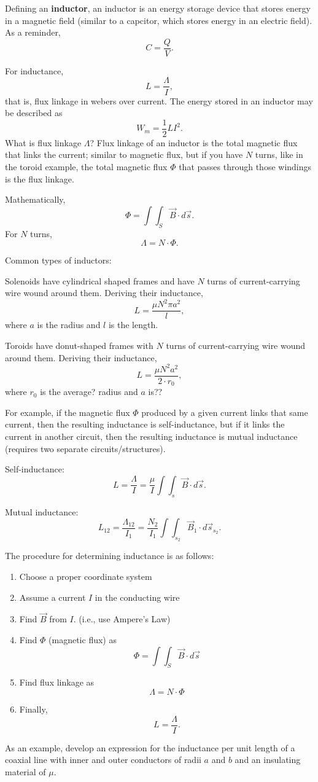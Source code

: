 \documentclass{article}
\begin{document}
Defining an \textbf{inductor}, an inductor is an energy storage device that stores energy in a magnetic field (similar to a capcitor, which stores energy in an electric field). As a reminder, \[C = \frac{Q}{V}.\]

For inductance, 
\[
  L = \frac{\Lambda}{I},
\]
that is, flux linkage in webers over current. The energy stored in an inductor may be described as 
\[
  W_m = \frac{1}{2}LI^2.
\]
What is flux linkage \(\Lambda\)? Flux linkage of an inductor is the total magnetic flux that links the current; similar to magnetic flux, but if you have \(N\) turns, like in the toroid example, the total magnetic flux \(\Phi\) that passes through those windings is the flux linkage.

Mathematically, 
\[
  \Phi = \int\int_S \vec{B} \cdot d \vec{s}.
\]
For \(N\) turns, 
\[
  \Lambda = N \cdot \Phi.
\]

Common types of inductors:

Solenoids have cylindrical shaped frames and have \(N\) turns of current-carrying wire wound around them. Deriving their inductance, 
\[
  L = \frac{\mu N^2 \pi a^2}{l},
\]
where \(a\) is the radius and \(l\) is the length. 

Toroids have donut-shaped frames with \(N\) turns of current-carrying wire wound around them. Deriving their inductance, 
\[
  L = \frac{\mu N^2 a^2}{2 \cdot r_0},
\]
where \(r_0\) is the average? radius and \(a\) is??

For example, if the magnetic flux \(\Phi\) produced by a given current links that same current, then the resulting inductance is self-inductance, but if it links the current in another circuit, then the resulting inductance is mutual inductance (requires two separate circuits/structures).

Self-inductance:
\[
	L = \frac{\Lambda}{I} = \frac{\mu}{I} \int \int_s \vec{B} \cdot d \vec{s}.
\]

Mutual inductance: 
\[
	L_{12} = \frac{\Lambda_{12}}{I_{1}} = \frac{N_2}{I_1} \int \int_{s_2} \vec{B}_1 \cdot d \vec{s}_{s_2}.
\]

The procedure for determining inductance is as follows:
\begin{enumerate}
	\item Choose a proper coordinate system
	\item Assume a current \(I\) in the conducting wire
	\item Find \(\vec{B}\) from \(I\). (i.e., use Ampere's Law)
	\item Find \(\Phi\) (magnetic flux) as
		\[
			\Phi = \int \int_S \vec{B} \cdot d \vec{s}
		\]
	\item Find flux linkage as
		\[
		  \Lambda = N \cdot \Phi
		\]
	\item Finally, 
		\[
		  L = \frac{\Lambda}{I}.
		\]
\end{enumerate}
As an example, develop an expression for the inductance per unit length of a coaxial line with inner and outer conductors of radii \(a\) and \(b\) and an insulating material of \(\mu\).
\end{document}

